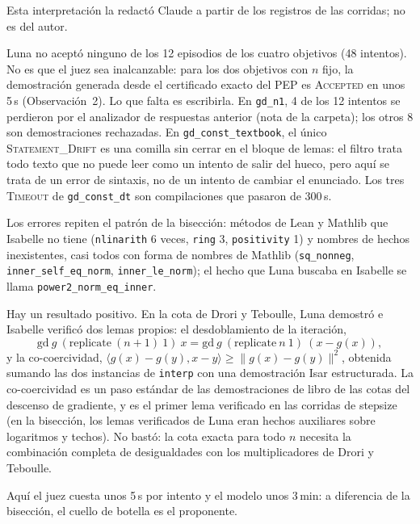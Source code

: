 Esta interpretación la redactó Claude a partir de los registros de las corridas; no es del autor.

Luna no aceptó ninguno de los 12 episodios de los cuatro objetivos (48 intentos). No es que el juez sea inalcanzable: para los dos objetivos con $n$ fijo, la demostración generada desde el certificado exacto del PEP es \textsc{Accepted} en unos 5\,s (Observación~2). Lo que falta es escribirla. En \texttt{gd\_n1}, 4 de los 12 intentos se perdieron por el analizador de respuestas anterior (nota de la carpeta); los otros 8 son demostraciones rechazadas. En \texttt{gd\_const\_textbook}, el único \textsc{Statement\_Drift} es una comilla sin cerrar en el bloque de lemas: el filtro trata todo texto que no puede leer como un intento de salir del hueco, pero aquí se trata de un error de sintaxis, no de un intento de cambiar el enunciado. Los tres \textsc{Timeout} de \texttt{gd\_const\_dt} son compilaciones que pasaron de 300\,s.

Los errores repiten el patrón de la bisección: métodos de Lean y Mathlib que Isabelle no tiene (\texttt{nlinarith} 6 veces, \texttt{ring} 3, \texttt{positivity} 1) y nombres de hechos inexistentes, casi todos con forma de nombres de Mathlib (\texttt{sq\_nonneg}, \texttt{inner\_self\_eq\_norm}, \texttt{inner\_le\_norm}); el hecho que Luna buscaba en Isabelle se llama \texttt{power2\_norm\_eq\_inner}.

Hay un resultado positivo. En la cota de Drori y Teboulle, Luna demostró e Isabelle verificó dos lemas propios: el desdoblamiento de la iteración,
\[ \mathrm{gd}\ g\ (\mathrm{replicate}\ (n+1)\ 1)\ x = \mathrm{gd}\ g\ (\mathrm{replicate}\ n\ 1)\ (x - g(x)), \] y la co-coercividad, $\langle g(x) - g(y), x - y\rangle \ge \|g(x) - g(y)\|^2$, obtenida sumando las dos instancias de \texttt{interp} con una demostración Isar estructurada. La co-coercividad es un paso estándar de las demostraciones de libro de las cotas del descenso de gradiente, y es el primer lema verificado en las corridas de stepsize (en la bisección, los lemas verificados de Luna eran hechos auxiliares sobre logaritmos y techos). No bastó: la cota exacta para todo $n$ necesita la combinación completa de desigualdades con los multiplicadores de Drori y Teboulle.

Aquí el juez cuesta unos 5\,s por intento y el modelo unos 3\,min: a diferencia de la bisección, el cuello de botella es el proponente.
